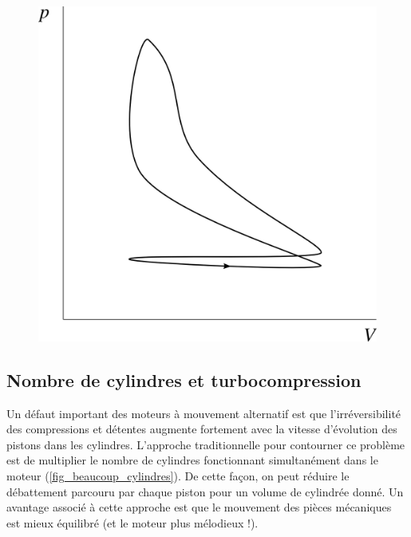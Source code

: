 		\begin{figure}
			\begin{center}
				\includegraphics[width=\didacticpvdiagramwidth]{images/pv_moteur_reel.png}
			\end{center}
			\label{fig_cycle_otto_reel}
		\end{figure}


	\subsection{Nombre de cylindres et turbocompression}
	\label{ch_turbo}

		Un défaut important des moteurs à mouvement alternatif est que l’irréversibilité des compressions et détentes augmente fortement avec la vitesse d’évolution des pistons dans les cylindres. L’approche traditionnelle pour contourner ce problème est de multiplier le nombre de cylindres fonctionnant simultanément dans le moteur (\cref{fig_beaucoup_cylindres}). De cette façon, on peut réduire le débattement parcouru par chaque piston pour un volume de cylindrée donné. Un avantage associé à cette approche est que le mouvement des pièces mécaniques est mieux équilibré (et le moteur plus mélodieux !).
		

